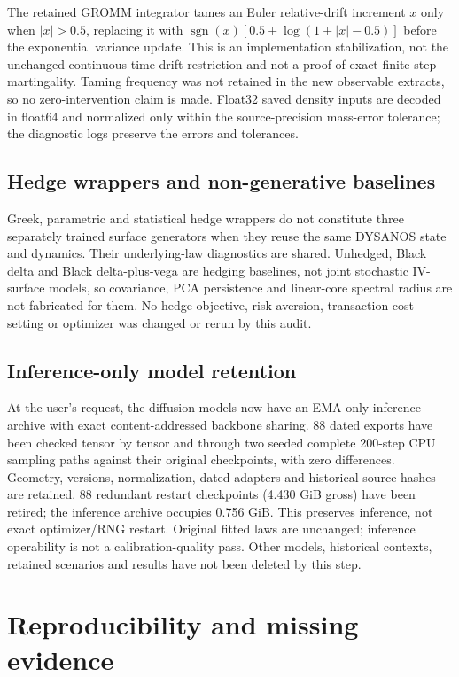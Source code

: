 \documentclass[11pt]{article}
\begin{document}
The retained GROMM integrator tames an Euler relative-drift increment $x$ only when $|x|>0.5$, replacing it with $\operatorname{sgn}(x)[0.5+\log(1+|x|-0.5)]$ before the exponential variance update. This is an implementation stabilization, not the unchanged continuous-time drift restriction and not a proof of exact finite-step martingality. Taming frequency was not retained in the new observable extracts, so no zero-intervention claim is made. Float32 saved density inputs are decoded in float64 and normalized only within the source-precision mass-error tolerance; the diagnostic logs preserve the errors and tolerances.

\subsection{Hedge wrappers and non-generative baselines}

Greek, parametric and statistical hedge wrappers do not constitute three separately trained surface generators when they reuse the same DYSANOS state and dynamics. Their underlying-law diagnostics are shared. Unhedged, Black delta and Black delta-plus-vega are hedging baselines, not joint stochastic IV-surface models, so covariance, PCA persistence and linear-core spectral radius are not fabricated for them. No hedge objective, risk aversion, transaction-cost setting or optimizer was changed or rerun by this audit.

\subsection{Inference-only model retention}

At the user's request, the diffusion models now have an EMA-only inference archive with exact content-addressed backbone sharing. 88 dated exports have been checked tensor by tensor and through two seeded complete 200-step CPU sampling paths against their original checkpoints, with zero differences. Geometry, versions, normalization, dated adapters and historical source hashes are retained. 88 redundant restart checkpoints (4.430 GiB gross) have been retired; the inference archive occupies 0.756 GiB. This preserves inference, not exact optimizer/RNG restart. Original fitted laws are unchanged; inference operability is not a calibration-quality pass. Other models, historical contexts, retained scenarios and results have not been deleted by this step.

\section{Reproducibility and missing evidence}
\end{document}
